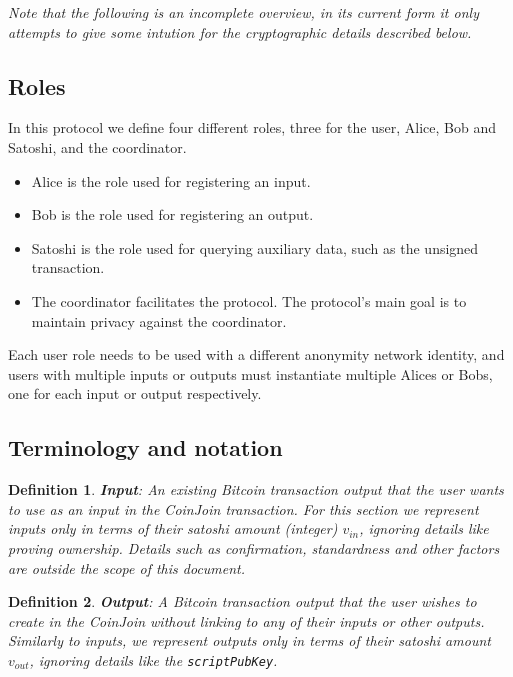 \documentclass{article}
\newtheorem{definition}{Definition}[section]
\begin{document}
\textit{Note that the following is an incomplete overview, in its current form it only attempts to give some intution for the cryptographic details described below.}

\subsection{Roles}
In this protocol we define four different roles, three for the user, Alice, Bob and Satoshi, and the coordinator.

\begin{itemize}
    \item Alice is the role used for registering an input.
    \item Bob is the role used for registering an output.
    \item Satoshi is the role used for querying auxiliary data, such as the unsigned transaction.
    \item The coordinator facilitates the protocol. The protocol's main goal is to maintain privacy against the coordinator.
\end{itemize}

Each user role needs to be used with a different anonymity network identity, and users with multiple inputs or outputs must instantiate multiple Alices or Bobs, one for each input or output respectively.

\subsection{Terminology and notation}

\begin{definition} \textbf{Input}:
An existing Bitcoin transaction output that the user wants to use as an input in the CoinJoin transaction. For this section we represent inputs only in terms of their satoshi amount (integer) $v_{\mathit{in}}$, ignoring details like proving ownership. Details such as confirmation, standardness and other factors are outside the scope of this document.
\end{definition}

\begin{definition} \textbf{Output}:
A Bitcoin transaction output that the user wishes to create in the CoinJoin without linking to any of their inputs or other outputs. Similarly to inputs, we represent outputs only in terms of their satoshi amount $v_{\mathit{out}}$, ignoring details like the \texttt{scriptPubKey}.
\end{definition}
\end{document}
